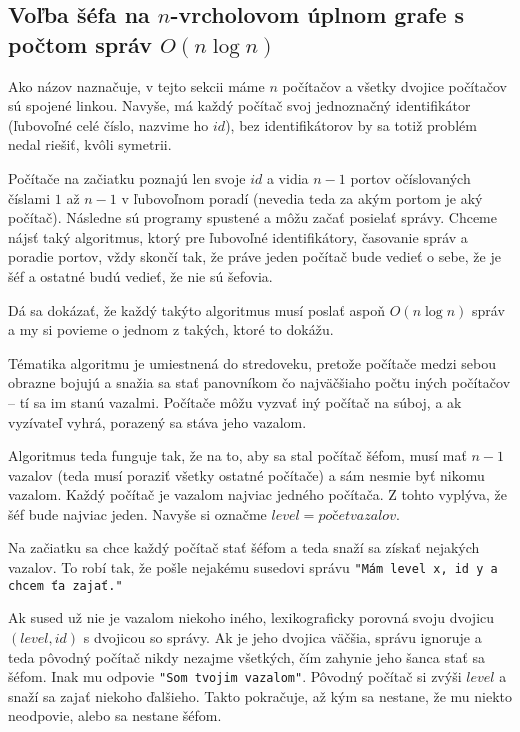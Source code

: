 \subsection{Voľba šéfa na $n$-vrcholovom úplnom grafe s počtom správ $O(n\log n)$}

Ako názov naznačuje, v tejto sekcii máme $n$ počítačov a všetky dvojice počítačov sú spojené linkou. 
Navyše, má každý počítač svoj jednoznačný identifikátor (ľubovoľné celé číslo, nazvime ho $id$), bez identifikátorov
by sa totiž problém nedal riešiť, kvôli symetrii.

Počítače na začiatku poznajú len svoje $id$ a vidia $n-1$ portov očíslovaných číslami $1$ až $n-1$ v
ľubovoľnom poradí (nevedia teda za akým portom je aký počítač). Následne sú programy spustené a môžu začať posielať správy.
Chceme nájsť taký algoritmus, ktorý pre ľubovoľné identifikátory, časovanie správ a poradie
portov, vždy skončí tak, že práve jeden počítač bude vedieť o sebe, že je šéf a ostatné budú vedieť, že nie sú šefovia.

Dá sa dokázať, že každý takýto algoritmus musí poslať aspoň $O(n\log n)$ správ a my si povieme o
jednom z takých, ktoré to dokážu.

Tématika algoritmu je umiestnená do stredoveku, pretože počítače medzi sebou obrazne bojujú a snažia
sa stať panovníkom čo najväčšiaho počtu iných počítačov -- tí sa im stanú vazalmi. 
Počítače môžu vyzvať iný počítač na súboj, a ak vyzívateľ vyhrá, porazený sa stáva jeho vazalom.

Algoritmus teda funguje tak, že na to, aby sa stal počítač šéfom, musí mať $n-1$ vazalov (teda musí
poraziť všetky ostatné počítače) a sám nesmie byť nikomu vazalom. Každý počítač je vazalom najviac 
jedného počítača. Z tohto vyplýva, že šéf bude najviac jeden. Navyše si označme $level = počet vazalov$.

Na začiatku sa chce každý počítač stať šéfom a teda snaží sa získať nejakých vazalov. To robí tak,
že pošle nejakému susedovi správu \verb!"Mám level x, id y a chcem ťa zajať."! 

Ak sused už nie je vazalom niekoho iného, lexikograficky porovná svoju dvojicu $(level, id)$ s dvojicou so správy. 
Ak je jeho dvojica väčšia, správu ignoruje a teda pôvodný počítač nikdy nezajme všetkých, čím
zahynie jeho šanca stať sa šéfom. 
Inak mu odpovie \verb!"Som tvojim vazalom"!. Pôvodný počítač si zvýši $level$ a snaží sa zajať niekoho
ďalšieho. Takto pokračuje, až kým sa nestane, že mu niekto neodpovie, alebo sa nestane šéfom.

